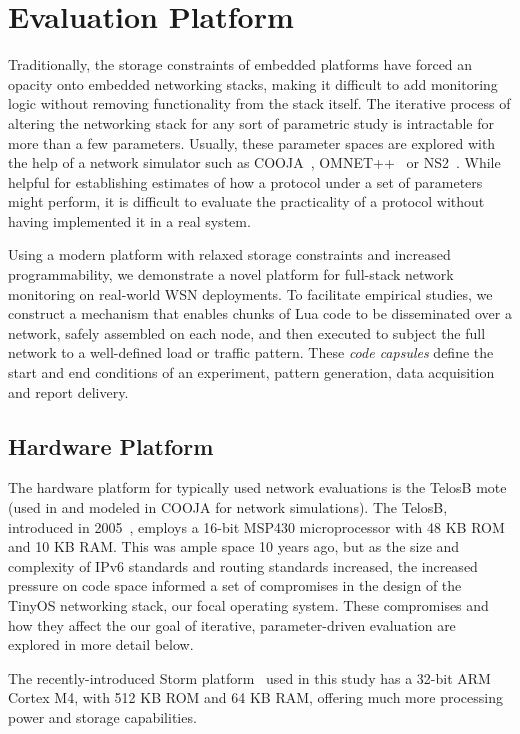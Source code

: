 \section{Evaluation Platform}

Traditionally, the storage constraints of embedded platforms have forced an opacity onto embedded networking stacks, making it difficult to add monitoring logic without removing functionality from the stack itself.
The iterative process of altering the networking stack for any sort of parametric study is intractable for more than a few parameters.
Usually, these parameter spaces are explored with the help of a network simulator such as COOJA~\cite{cooja}, OMNET++~\cite{omnet++} or NS2~\cite{ns2}.
While helpful for establishing estimates of how a protocol under a set of parameters might perform, it is difficult to evaluate the practicality of a protocol without having implemented it in a real system.

Using a modern platform with relaxed storage constraints and increased programmability, we demonstrate a novel platform for full-stack network monitoring on real-world WSN deployments.
To facilitate empirical studies, we construct a mechanism that enables chunks of Lua code to be disseminated over a network, safely assembled on each node, and then executed to subject the full network to a well-defined load or traffic pattern.
These \emph{code capsules} define the start and end conditions of an experiment, pattern generation, data acquisition and report delivery.

\subsection{Hardware Platform}

The hardware platform for typically used network evaluations is the TelosB mote (used in \cite{ko2011evaluating} and modeled in COOJA for network simulations).
The TelosB, introduced in 2005~\cite{polastre2005telos},  employs a 16-bit MSP430 microprocessor with 48 KB ROM and 10 KB RAM.
This was ample space 10 years ago, but as the size and complexity of IPv6 standards and routing standards increased, the increased pressure on code space informed a set of compromises in the design of the TinyOS networking stack, our focal operating system.
These compromises and how they affect the our goal of iterative, parameter-driven evaluation are explored in more detail below.

The recently-introduced Storm platform~\cite{andersen2016system} used in this study has a 32-bit ARM Cortex M4, with 512 KB ROM and 64 KB RAM, offering much more processing power and storage capabilities.

